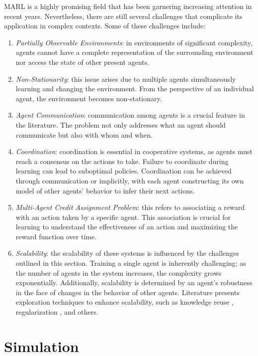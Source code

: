 \documentclass[12pt,a4paper,openright,twoside]{book}
\begin{document}
MARL is a highly promising field that has been garnering increasing attention in recent years. Nevertheless, there are still several 
    challenges that complicate its application in complex contexts. Some of these challenges include:
\begin{enumerate}
    \item  \emph{Partially Observable Environments}: in environments of significant complexity, agents cannot have a complete 
        representation of the surrounding environment nor access the state of other present agents.
    \item \emph{Non-Stationarity}: this issue arises due to multiple agents simultaneously learning and changing the environment.
        From the perspective of an individual agent, the environment becomes non-stationary.
    \item  \emph{Agent Communication}: communication among agents is a crucial feature in the literature. The problem not only 
        addresses what an agent should communicate but also with whom and when.
    \item  \emph{Coordination}: coordination is essential in cooperative systems, as agents must reach a consensus on the actions 
        to take. Failure to coordinate during learning can lead to suboptimal policies. Coordination can be achieved through communication 
        or implicitly, with each agent constructing its own model of other agents' behavior to infer their next actions.
    \item  \emph{Multi-Agent Credit Assignment Problem}: this refers to associating a reward with an action taken by a specific agent. 
        This association is crucial for learning to understand the effectiveness of an action and maximizing the reward function over time.
    \item  \emph{Scalability}: the scalability of these systems is influenced by the challenges outlined in this section. Training a single 
        agent is inherently challenging; as the number of agents in the system increases, the complexity grows exponentially. 
        Additionally, scalability is determined by an agent's robustness in the face of changes in the behavior of other agents. 
        Literature presents exploration techniques to enhance scalability, such as knowledge reuse \cite{da2018autonomously}, 
        regularization \cite{roy2020promoting, su2022divergence}, and others.
\end{enumerate}

\section{Simulation}
\end{document}
